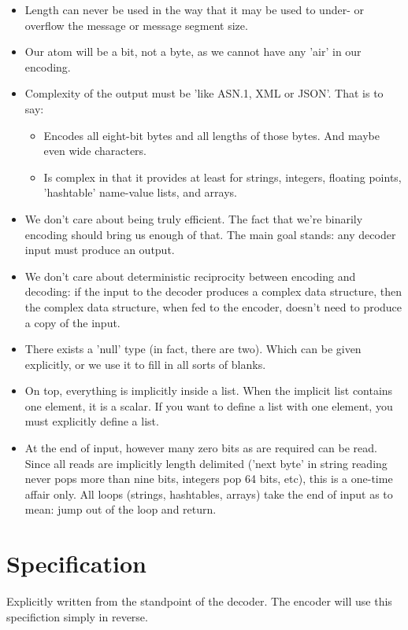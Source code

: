 \begin{itemize}
\item Length can never be used in the way that it may be used to 
  under- or overflow the message or message segment size.
\item Our atom will be a bit, not a byte, as we cannot have any 'air'
  in our encoding.
\item Complexity of the output must be 'like ASN.1, XML or JSON'.
  That is to say:
  \begin{itemize}
  \item Encodes all eight-bit bytes and all lengths of those bytes.
        And maybe even wide characters.
  \item Is complex in that it provides at least for strings, integers,
        floating points, 'hashtable' name-value lists, and arrays.
  \end{itemize}
\item We don't care about being truly efficient. The fact that we're
  binarily encoding should bring us enough of that. The main goal stands:
  any decoder input must produce an output.
\item We don't care about deterministic reciprocity between encoding
  and decoding: if the input to the decoder produces
  a complex data structure, then the complex data structure, when fed
  to the encoder, doesn't need to produce a copy of the input.
\item There exists a 'null' type (in fact, there are two).
  Which can be given explicitly, or
  we use it to fill in all sorts of blanks.
\item On top, everything is implicitly inside a list.
  When the implicit list contains
  one element, it is a scalar. If you want to define a list with
  one element, you must explicitly define a list.
\item At the end of input, however many zero bits as are required can be read.
  Since all reads are implicitly length delimited ('next byte' in string 
  reading never pops more than nine bits, integers pop 64 bits, etc),
  this is a one-time affair only. All loops (strings, hashtables, arrays)
  take the end of input as to mean: jump out of the loop and return.
\end{itemize}

\section{Specification}

Explicitly written from the standpoint of the decoder.
The encoder will use this specifiction simply in reverse.

